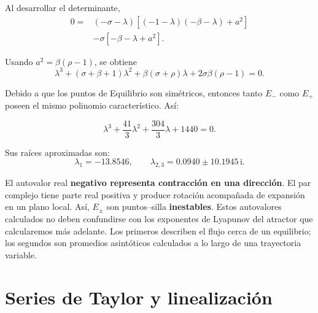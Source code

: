 \documentclass[12pt,a4paper,oneside]{report}
\numberwithin{equation}{chapter}
\begin{document}
Al desarrollar el determinante,
\begin{align}
    0={}&(-\sigma-\lambda) \left[(-1-\lambda)(-\beta-\lambda)+a^2\right]\nonumber\\
    &-\sigma\left[-\beta-\lambda+a^2\right].
\end{align}

Usando \(a^2=\beta(\rho-1)\), se obtiene
\begin{equation}
    \boxed{ \lambda^3+(\sigma+\beta+1)\lambda^2 +\beta(\sigma+\rho)\lambda +2\sigma\beta(\rho-1)=0.}
    \label{eq:polinomio-Epm}
\end{equation}

Debido a que los puntos de Equilibrio son simétricos, entonces tanto \(E_-\) como \(E_+\) poseen el mismo polinomio característico. Así:

\begin{equation}
    \lambda^3+\frac{41}{3}\lambda^2 +\frac{304}{3}\lambda+1440=0.
\end{equation}

Sus raíces aproximadas son:
\begin{equation}
    \boxed{ \lambda_1=-13.8546,\qquad \lambda_{2,3}=0.0940\pm10.1945\,\mathrm{i}.}
\end{equation}

El autovalor real \textbf{negativo representa contracción en una dirección}. El par complejo tiene parte real positiva y produce rotación acompañada de expansión en un plano local. Así, \(E_\pm\) son puntos--silla \textbf{inestables}. Estos autovalores calculados no deben confundirse con los exponentes de Lyapunov del atractor que calcularemos más adelante. Los primeros describen el flujo cerca de un equilibrio; los segundos son promedios asintóticos calculados a lo largo de una trayectoria variable.

\chapter{Series de Taylor y linealización}
\end{document}
